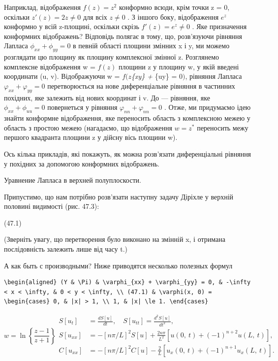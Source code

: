 \documentclass[
  ukrainian,
]{article}
\begin{document}
Наприклад, відображення \(f(z) = z^2\) конформно всюди, крім точки z =
0, оскільки \(z'(z) = 2z \neq 0\) для всіх \(z \neq 0\) . З іншого боку,
відображення \(e^z\) конформно у всій z-площині, оскільки скрізь
\(f'(z) = e^z \neq 0\) . Яке призначення конформних відображень?
Відповідь полягає в тому, що, розв'язуючи рівняння Лапласа
\(\phi_{xx} + \phi_{yy} = 0\) в певній області площини змінних x і y, ми
можемо розглядати цю площину як площину комплексної змінної z.
Розглянемо комплексне відображення w = \(f(z)\) площини z у площину w, у
якій введені координати (u, v). Відображуючи w = \(f(z\)\phi\emph{\{xy\}
+ \phi}\{uy\} = 0\()\), рівняння Лапласа
\(\varphi_{xx} + \varphi_{yy} = 0\) перетворюється на нове
диференціальне рівняння в частинних похідних, яке залежить від нових
координат і v. До --- рівняння, яке \(\phi_{xx} + \phi_{uu} = 0\)
повернеться у рівняння \(\varphi_{nn} + \varphi_{nn} = 0\) . Отже, ми
придумаємо ідею знайти конформне відображення, яке переносить область з
комплексною межею у область з простою межею (нагадаємо, що відображення
\(w=z^*\) переносить межу першого квадранта площини z у дійсну вісь
площини w).

Ось кілька прикладів, які покажуть, як можна розв'язати диференціальні
рівняння у похідних за допомогою конформних відображень.

Уравнение Лапласа в верхней полуплоскости.

Припустимо, що нам потрібно розв'язати наступну задачу Діріхле у верхній
половині видимості (рис. 47.3):

(47.1)

(Зверніть увагу, що перетворення було виконано на змінній x, і отримана
послідовність залежить лише від часу t.)

А как быть с производными? Ниже приводятся несколько полезных формул

\begin{verbatim}
\begin{aligned} (Y & \Pi) & \varphi_{xx} + \varphi_{yy} = 0, & -\infty < x < \infty, & 0 < y < \infty, \\ (47.1) & \varphi(x, 0) = \begin{cases} 0, & |x| > 1, \\ 1, & |x| \le 1. \end{cases}
\end{verbatim}

\[
w = \ln\left\{\frac{z-1}{z+1}\right\}
\begin{split} S\left[u_{t}\right] &= \frac{dS\left[u\right]}{dt}, \quad S\left[u_{tt}\right] = \frac{d^{2}S\left[u\right]}{dt^{2}}, \\ S\left[u_{xx}\right] &= -\left[n\pi/L\right]^{2}S\left[u\right] + \frac{2n\pi}{L^{2}}\left[u\left(0,\ t\right) + (-1)^{n+2}u\left(L,\ t\right)\right], \\ C\left[u_{xx}\right] &= -\left[n\pi/L\right]^{2}C\left[u\right] - \frac{2}{L}\left[u_{x}\left(0,\ t\right) + (-1)^{n+1}u_{x}\left(L,\ t\right)\right]. \end{split}
\]
\end{document}
